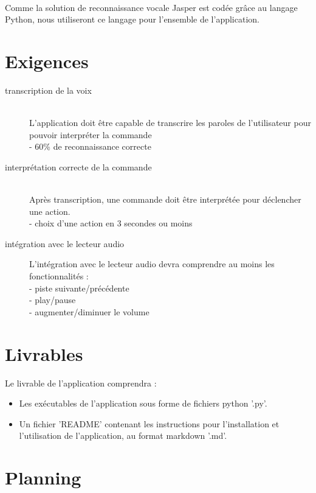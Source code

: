 \documentclass[12pt]{article}
\begin{document}
\paragraph{}
Comme la solution de reconnaissance vocale Jasper est codée grâce au langage
Python, nous utiliseront ce langage pour l'ensemble de l'application.

    \section{Exigences}

    \begin{description}
        \item[transcription de la voix] \hfill \\
        L'application doit être capable de transcrire
        les paroles de l'utilisateur pour pouvoir interpréter la
        commande \\
        - 60\% de reconnaissance correcte

        \item[interprétation correcte de la commande] \hfill \\
        Après transcription, une
        commande doit être interprétée pour déclencher une action. \\
        - choix d'une action en 3 secondes ou moins 

        \item[intégration avec le lecteur audio]
        L'intégration avec le lecteur audio devra comprendre au moins les fonctionnalités : \\
        - piste suivante/précédente \\
        - play/pause \\
        - augmenter/diminuer le volume \\

    \end{description}

    \section{Livrables}

    Le livrable de l'application comprendra :

    \begin{itemize}
        \item Les exécutables de l'application sous forme de fichiers python '.py'.
        \item Un fichier 'README' contenant les instructions pour l'installation et 
            l'utilisation de l'application, au format markdown '.md'.
    \end{itemize}

    \section{Planning}
\end{document}
